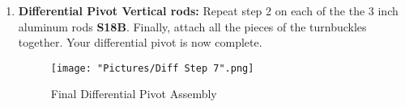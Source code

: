 \documentclass[12pt]{article}
\begin{document}
\begin{enumerate}
\item \textbf{Differential Pivot Vertical rods:} Repeat step 2 on each of the the 3 inch aluminum rods \textbf{S18B}. Finally, attach all the pieces of the turnbuckles together.  Your differential pivot is now complete.

\begin{figure}[H]
\centering
  \texttt{[image: "Pictures/Diff Step 7".png]}
	\caption{Final Differential Pivot Assembly}
\end{figure}


\end{enumerate}
\end{document}
